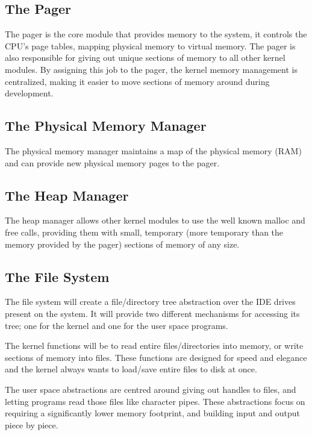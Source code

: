 \documentclass[a4paper]{report}
\begin{document}
\subsection{The Pager}

The pager is the core module that provides memory to the system, it controls the CPU's page tables, mapping physical memory to virtual memory. The pager is also responsible for giving out unique sections of memory to all other kernel modules. By assigning this job to the pager, the kernel memory management is centralized, making it easier to move sections of memory around during development.

\subsection{The Physical Memory Manager}

The physical memory manager maintains a map of the physical memory (RAM) and can provide new physical memory pages to the pager.

\subsection{The Heap Manager}

The heap manager allows other kernel modules to use the well known malloc and free calls, providing them with small, temporary (more temporary than the memory provided by the pager) sections of memory of any size.

\subsection{The File System}

The file system will create a file/directory tree abstraction over the IDE drives present on the system. It will provide two different mechanisms for accessing its tree; one for the kernel and one for the user space programs.

The kernel functions will be to read entire files/directories into memory, or write sections of memory into files. These functions are designed for speed and elegance and the kernel always wants to load/save entire files to disk at once.

The user space abstractions are centred around giving out handles to files, and letting programs read those files like character pipes. These abstractions focus on requiring a significantly lower memory footprint, and building input and output piece by piece.
\end{document}
